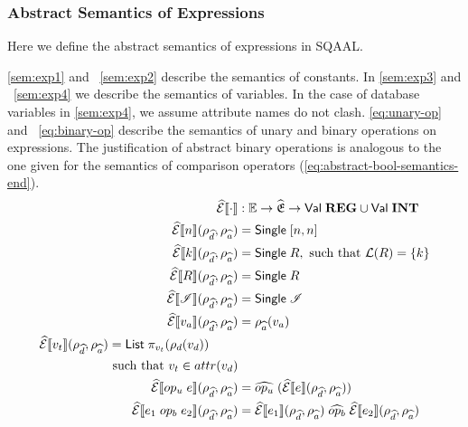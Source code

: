 \subsubsection{Abstract Semantics of Expressions}

Here we define the abstract semantics of expressions in SQAAL.

\autoref{sem:exp1} and ~\ref{sem:exp2} describe the semantics of constants.
In \autoref{sem:exp3} and ~\ref{sem:exp4} we describe the semantics of variables.
In the case of database variables in \autoref{sem:exp4}, we assume attribute names do not clash.
\autoref{eq:unary-op} and ~\ref{eq:binary-op} describe the semantics of unary and binary operations on expressions.
The justification of abstract binary operations is analogous to the one given for the semantics of comparison operators (\autoref{eq:abstract-bool-semantics-end}).
\begin{align}
    \absexpsem{\cdot} &: \mathbb{E} \rightarrow \ab{\mathfrak{E}} \rightarrow \mathsf{Val} \; \mathbf{REG} \cup \mathsf{Val} \; \mathbf{INT}\\
    \absexpsem{n}(\rho_{\ab{d}}, \rho_{\ab{a}}) &= \mathsf{Single} \; [n, n] \label{sem:exp1} \\
    \absexpsem{k}(\rho_{\ab{d}}, \rho_{\ab{a}}) &= \mathsf{Single} \; R,  \text{ such that }\mathcal{L}(R) = \{ k \} \label{sem:exp2} \\
    \absexpsem{R}(\rho_{\ab{d}}, \rho_{\ab{a}}) &= \mathsf{Single} \; R \\
    \absexpsem{\mathscr{I}}(\rho_{\ab{d}}, \rho_{\ab{a}}) &= \mathsf{Single} \; \mathscr{I} \\
    \absexpsem{v_a}(\rho_{\ab{d}}, \rho_{\ab{a}}) &=  \rho_{\ab{a}}(v_a) \label{sem:exp3} \\
    \begin{split}
        \absexpsem{v_t}(\rho_{\ab{d}}, \rho_{\ab{a}}) &=  \mathsf{List} \; \pi_{v_t}(\rho_d(v_d)) \\
        &\text{ such that } v_t \in attr(v_d) \label{sem:exp4}
    \end{split} \\
    \absexpsem{op_u \; e}(\rho_{\ab{d}}, \rho_{\ab{a}}) &= \ab{op_u} \; (\absexpsem{e}(\rho_{\ab{d}}, \rho_{\ab{a}})) \label{eq:unary-op} \\
    \absexpsem{e_1 \;op_b\; e_2}(\rho_{\ab{d}}, \rho_{\ab{a}}) &= \absexpsem{e_1}(\rho_{\ab{d}}, \rho_{\ab{a}}) \;\ab{op_b}\; \absexpsem{e_2}(\rho_{\ab{d}}, \rho_{\ab{a}}) \label{eq:binary-op}
\end{align}
